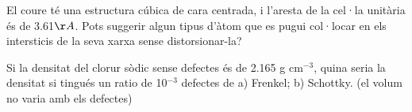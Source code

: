 \begin{exr}{}
El coure té una estructura cúbica de cara centrada, i l'aresta de la cel·la unitària és de 3.61${\AA}$. Pots suggerir algun tipus d'àtom que es pugui col·locar en els  intersticis de la seva xarxa sense distorsionar-la?
\end{exr}

\begin{exr}{}
Si la densitat del clorur sòdic sense defectes és de 2.165 g cm$^{-3}$, quina seria la densitat si tingués un ratio de 10$^{-3}$ defectes de a) Frenkel; b) Schottky. (el volum no varia amb els defectes)
\end{exr}

